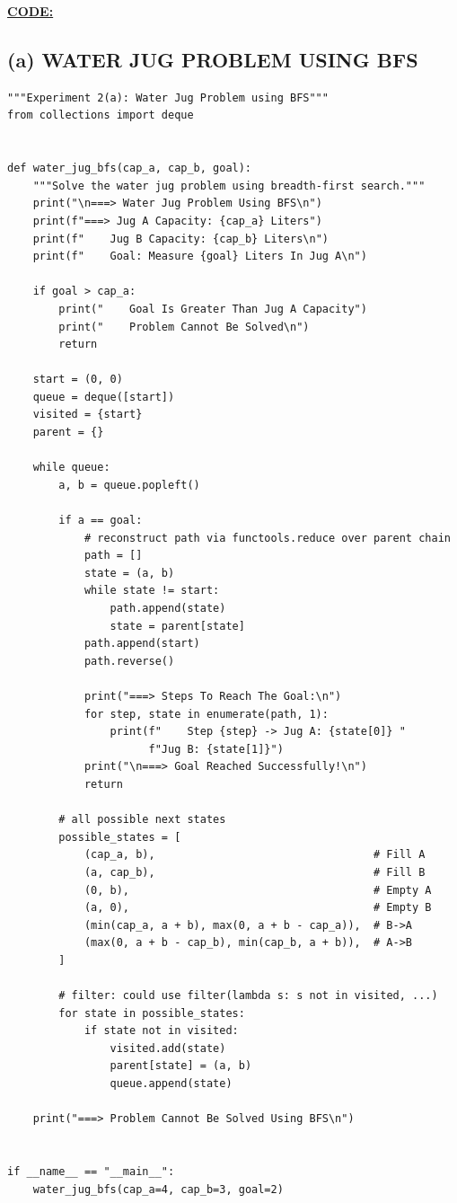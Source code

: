 \documentclass[12pt,a4paper]{article}
\begin{document}
\vspace{0.5cm}
\textbf{\underline{CODE:}}

\subsection{(a) WATER JUG PROBLEM USING BFS}

\begin{lstlisting}[style=pythonstyle]
"""Experiment 2(a): Water Jug Problem using BFS"""
from collections import deque


def water_jug_bfs(cap_a, cap_b, goal):
    """Solve the water jug problem using breadth-first search."""
    print("\n===> Water Jug Problem Using BFS\n")
    print(f"===> Jug A Capacity: {cap_a} Liters")
    print(f"    Jug B Capacity: {cap_b} Liters\n")
    print(f"    Goal: Measure {goal} Liters In Jug A\n")

    if goal > cap_a:
        print("    Goal Is Greater Than Jug A Capacity")
        print("    Problem Cannot Be Solved\n")
        return

    start = (0, 0)
    queue = deque([start])
    visited = {start}
    parent = {}

    while queue:
        a, b = queue.popleft()

        if a == goal:
            # reconstruct path via functools.reduce over parent chain
            path = []
            state = (a, b)
            while state != start:
                path.append(state)
                state = parent[state]
            path.append(start)
            path.reverse()

            print("===> Steps To Reach The Goal:\n")
            for step, state in enumerate(path, 1):
                print(f"    Step {step} -> Jug A: {state[0]} "
                      f"Jug B: {state[1]}")
            print("\n===> Goal Reached Successfully!\n")
            return

        # all possible next states
        possible_states = [
            (cap_a, b),                                  # Fill A
            (a, cap_b),                                  # Fill B
            (0, b),                                      # Empty A
            (a, 0),                                      # Empty B
            (min(cap_a, a + b), max(0, a + b - cap_a)),  # B->A
            (max(0, a + b - cap_b), min(cap_b, a + b)),  # A->B
        ]

        # filter: could use filter(lambda s: s not in visited, ...)
        for state in possible_states:
            if state not in visited:
                visited.add(state)
                parent[state] = (a, b)
                queue.append(state)

    print("===> Problem Cannot Be Solved Using BFS\n")


if __name__ == "__main__":
    water_jug_bfs(cap_a=4, cap_b=3, goal=2)
\end{lstlisting}
\end{document}

